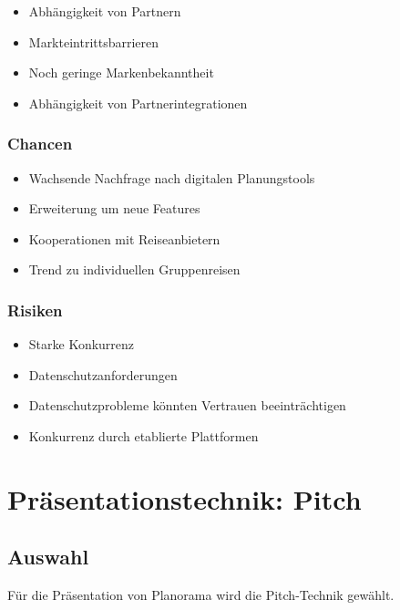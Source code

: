 \documentclass{article}
\begin{document}
\begin{itemize}
\tightlist
\item
  Abhängigkeit von Partnern
\item
  Markteintrittsbarrieren
\item
  Noch geringe Markenbekanntheit
\item
  Abhängigkeit von Partnerintegrationen
\end{itemize}

\subsubsection{Chancen}\label{chancen}

\begin{itemize}
\tightlist
\item
  Wachsende Nachfrage nach digitalen Planungstools
\item
  Erweiterung um neue Features
\item
  Kooperationen mit Reiseanbietern
\item
  Trend zu individuellen Gruppenreisen
\end{itemize}

\subsubsection{Risiken}\label{risiken}

\begin{itemize}
\tightlist
\item
  Starke Konkurrenz
\item
  Datenschutzanforderungen
\item
  Datenschutzprobleme könnten Vertrauen beeinträchtigen
\item
  Konkurrenz durch etablierte Plattformen
\end{itemize}

\newpage

\section{Präsentationstechnik:
Pitch}\label{pruxe4sentationstechnik-pitch}

\subsection{Auswahl}\label{auswahl-1}

Für die Präsentation von Planorama wird die Pitch-Technik gewählt.
\end{document}
